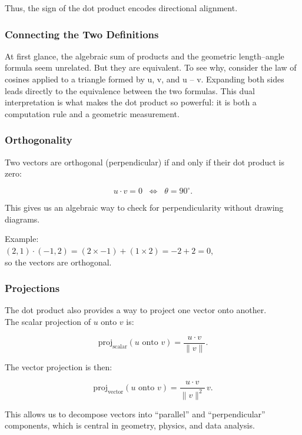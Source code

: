 \documentclass[
  letterpaper,
  DIV=11,
  numbers=noendperiod]{scrreprt}
\begin{document}
Thus, the sign of the dot product encodes directional alignment.

\subsubsection{Connecting the Two
Definitions}\label{connecting-the-two-definitions}

At first glance, the algebraic sum of products and the geometric
length--angle formula seem unrelated. But they are equivalent. To see
why, consider the law of cosines applied to a triangle formed by u, v,
and u -- v. Expanding both sides leads directly to the equivalence
between the two formulas. This dual interpretation is what makes the dot
product so powerful: it is both a computation rule and a geometric
measurement.

\subsubsection{Orthogonality}\label{orthogonality}

Two vectors are orthogonal (perpendicular) if and only if their dot
product is zero:

\[
u \cdot v = 0 \;\;\Longleftrightarrow\;\; \theta = 90^\circ.
\]

This gives us an algebraic way to check for perpendicularity without
drawing diagrams.

Example:\\
\((2, 1) \cdot (-1, 2) = (2 \times -1) + (1 \times 2) = -2 + 2 = 0\),\\
so the vectors are orthogonal.

\subsubsection{Projections}\label{projections}

The dot product also provides a way to project one vector onto
another.\\
The scalar projection of \(u\) onto \(v\) is:

\[
\text{proj}_{\text{scalar}}(u \text{ onto } v) = \frac{u \cdot v}{\|v\|}.
\]

The vector projection is then:

\[
\text{proj}_{\text{vector}}(u \text{ onto } v) = \frac{u \cdot v}{\|v\|^2} \, v.
\]

This allows us to decompose vectors into ``parallel'' and
``perpendicular'' components, which is central in geometry, physics, and
data analysis.
\end{document}
